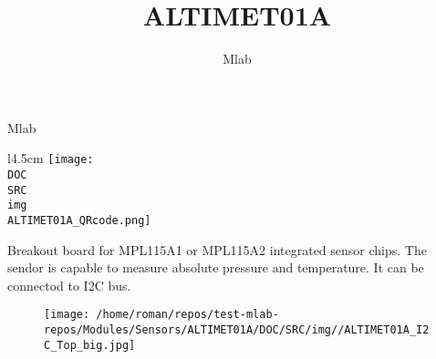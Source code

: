 \documentclass[12pt,a4paper]{article}
\author{ Mlab }
\title{ ALTIMET01A }
\begin{document}
\fontsize{14.4}{20}\selectfont

\vspace*{\fill}

\begin{center}
{\Huge 

}

{\Large Mlab}

\vspace*{\fill}
\vspace*{1cm}

\end{center}

\begin{wrapfigure}{l}{4.5cm}
    \texttt{[image: \\DOC\\SRC\\img\\ALTIMET01A\_QRcode.png]}
\end{wrapfigure}

Breakout board for MPL115A1 or MPL115A2 integrated sensor chips. The
sendor is capable to measure absolute pressure and temperature. It can
be connectod to I2C bus.


\vspace*{\fill}
\vfill
\vspace*{1cm}

\begin{figure}[ht!]
\centering
\texttt{[image: /home/roman/repos/test-mlab-repos/Modules/Sensors/ALTIMET01A/DOC/SRC/img//ALTIMET01A\_I2C\_Top\_big.jpg]} 
\end{figure}





\newpage



\end{document}
